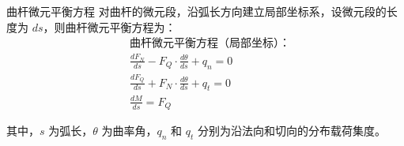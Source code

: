 \begin{myTheorem}{曲杆微元平衡方程}
    对曲杆的微元段，沿弧长方向建立局部坐标系，设微元段的长度为 \(ds\)，则曲杆微元平衡方程为：
\begin{align*}
    &\text{曲杆微元平衡方程（局部坐标）：} \\
    &\frac{dF_N}{ds} - F_Q \cdot \frac{d\theta}{ds} + q_n = 0 \\
    &\frac{dF_Q}{ds} + F_N \cdot \frac{d\theta}{ds} + q_t = 0 \\
    &\frac{dM}{ds} = F_Q
\end{align*}
\end{myTheorem}
其中，\(s\) 为弧长，\(\theta\) 为曲率角，\(q_n\) 和 \(q_t\) 分别为沿法向和切向的分布载荷集度。





